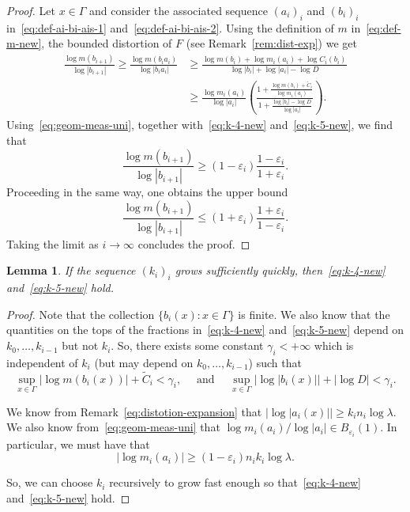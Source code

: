 \documentclass[english, 10pt]{amsart}
\numberwithin{equation}{section}
\theoremstyle{definition}
\theoremstyle{plain}
\newtheorem{lemma}[definition]{Lemma}
\theoremstyle{plain}
\theoremstyle{definition}
\theoremstyle{definition}
\theoremstyle{plain}
\theoremstyle{definition}
\newcommand{\eps}{\varepsilon}
\newcommand{\quand}{\quad\text{ and } \quad}
\numberwithin{equation}{section}
\begin{document}
\begin{proof}
  Let $x\in \Gamma$ and consider the associated sequence $(a_i)_i$ and $(b_i)_i$ in~\eqref{eq:def-ai-bi-ais-1} and~\eqref{eq:def-ai-bi-ais-2}.
  Using the definition of $m$ in~\eqref{eq:def-m-new}, the bounded distortion of $F$ (see Remark~\ref{rem:dist-exp}) we get 
  \begin{align*}
    \frac{ \log m ( b_{ i + 1} ) }{ \log |b_{ i + 1}| }
    \ge
    \frac{ \log m ( b_{ i } a_i ) }{ \log  |b_{ i } a_i| }
    &\ge
    \frac{ \log m ( b_i ) + \log m_i (a_i) + \log C_i (b_i) }
    { \log |b_i|  + \log |a_i| - \log D } \\
    &\ge
    \frac{ \log m_i (a_i) }{ \log |a_i| }
    \left(
      \frac{ 1
       + \frac{ \log m ( b_i ) + \widetilde{C}_i }{ \log m_i (a_i) }
      }{ 1
       + \frac{ \log |b_i| - \log D }{ \log |a_i|}
      }
    \right)
    .
  \end{align*}
  Using~\eqref{eq:geom-meas-uni}, together with~\eqref{eq:k-4-new} and~\eqref{eq:k-5-new}, we find that
  \[
    \frac{ \log m ( b_{ i + 1} ) }{ \log  |b_{ i + 1}| } \ge 
    (1 - \eps_i) \frac{ 1 - \eps_i }{ 1 + \eps_i }.
  \]
  Proceeding in the same way, one obtains the upper bound
  \[
    \frac{ \log m ( b_{i + 1} )}{\log |b_{i + 1 }| }
    \le
    (1 + \eps_i) \frac{ 1 + \eps_i }{ 1 - \eps_i }.
  \]
  Taking the limit as $i\to \infty$ concludes the proof.
\end{proof}


\begin{lemma}\label{lem:ki-4-and-5}
  If the sequence $(k_i)_{i}$ grows sufficiently quickly,
  then~\eqref{eq:k-4-new} and~\eqref{eq:k-5-new} hold.
\end{lemma}

\begin{proof}
  Note that the collection $\{ b_i (x) \colon x \in \Gamma \}$ is finite. We also know that the quantities on the tops of the fractions in~\eqref{eq:k-4-new} and~\eqref{eq:k-5-new} depend on $k_0,\ldots,k_{i-1}$ but not $k_i$. So, there exists some constant $\gamma_i < +\infty$ which is independent of $k_i$ (but may depend on $k_0,\ldots,k_{i-1}$) such that
  \[
    \sup_{x\in\Gamma} |\log m ( b_i (x) )| + \widetilde C_i
    < \gamma_i,
    \quand
    \sup_{x\in\Gamma}\big| \log |b_i (x) |\big| + |\log D | < \gamma_i.
  \]
  
  We know from Remark~\ref{eq:distotion-expansion} that $\big|\log |a_i(x)|\big| \ge  k_{i} n_i \log \lambda$.
  We also know from~\eqref{eq:geom-meas-uni} that $\log m_{i} (a_i) / \log |a_{i} | \in B_{\eps_i} (1)$. In particular, we must have that
  \[  
    | \log m_{i} (a_i)|
    \ge (1 - \eps_i ) n_i k_i \log \lambda.
  \]

  So, we can choose $k_i$ recursively to grow fast enough so that~\eqref{eq:k-4-new} and~\eqref{eq:k-5-new} hold.
\end{proof}
\end{document}
